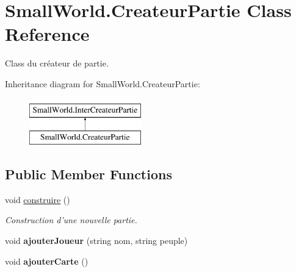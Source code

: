 \hypertarget{class_small_world_1_1_createur_partie}{\section{Small\-World.\-Createur\-Partie Class Reference}
\label{class_small_world_1_1_createur_partie}
}


Class du créateur de partie.  


Inheritance diagram for Small\-World.\-Createur\-Partie\-:\begin{figure}[H]
\begin{center}
\leavevmode
\includegraphics[height=2.000000cm]{class_small_world_1_1_createur_partie}
\end{center}
\end{figure}
\subsection*{Public Member Functions}
\begin{DoxyCompactItemize}
\item 
\hypertarget{class_small_world_1_1_createur_partie_a6c808936d929f91fa222ec40dde0105a}{void \hyperlink{class_small_world_1_1_createur_partie_a6c808936d929f91fa222ec40dde0105a}{construire} ()}\label{class_small_world_1_1_createur_partie_a6c808936d929f91fa222ec40dde0105a}

\begin{DoxyCompactList}\small\item\em Construction d'une nouvelle partie. \end{DoxyCompactList}\item 
\hypertarget{class_small_world_1_1_createur_partie_a9e8071dc3842e4389624728e84907008}{void {\bfseries ajouter\-Joueur} (string nom, string peuple)}\label{class_small_world_1_1_createur_partie_a9e8071dc3842e4389624728e84907008}

\item 
\hypertarget{class_small_world_1_1_createur_partie_ab8bc779d1ffd06f5715e43876e68aabf}{void {\bfseries ajouter\-Carte} ()}\label{class_small_world_1_1_createur_partie_ab8bc779d1ffd06f5715e43876e68aabf}

\end{DoxyCompactItemize}
